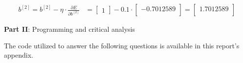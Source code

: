 \documentclass[12pt]{article}
\begin{document}
\begin{enumerate}[leftmargin=\labelsep]
        \begin{equation*}
          \begin{aligned}
            b^{[2]} = b^{[2]} - \eta \cdot \frac{\partial E}{\partial b^{[2]}}
             & = \begin{bmatrix}
                   1
                 \end{bmatrix} - 0.1 \cdot \begin{bmatrix}
                  -0.7012589\\
                \end{bmatrix} = \begin{bmatrix}
              1.7012589\\
            \end{bmatrix}
          \end{aligned}
        \end{equation*}

\end{enumerate}

\pagebreak

\center\large{\textbf{Part II}: Programming and critical analysis}

\begin{justify}
  The code utilized to answer the following questions is available in this
  report's appendix.
\end{justify}
\end{document}
